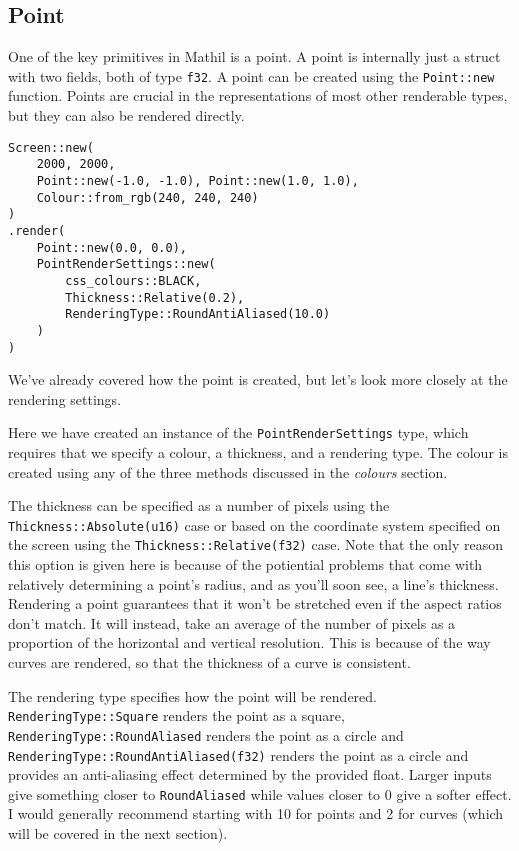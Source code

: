 \subsection{Point}

One of the key primitives in Mathil is a point. A point is internally just a struct with two fields, both of type \verb|f32|. A point can be created using the \verb|Point::new| function. Points are crucial in the representations of most other renderable types, but they can also be rendered directly.

\begin{lstlisting}
Screen::new(
    2000, 2000,
    Point::new(-1.0, -1.0), Point::new(1.0, 1.0),
    Colour::from_rgb(240, 240, 240)
)
.render(
    Point::new(0.0, 0.0),
    PointRenderSettings::new(
        css_colours::BLACK,
        Thickness::Relative(0.2),
        RenderingType::RoundAntiAliased(10.0)
    )
)
\end{lstlisting}


We've already covered how the point is created, but let's look more closely at the rendering settings.

Here we have created an instance of the \verb|PointRenderSettings| type, which requires that we specify a colour, a thickness, and a rendering type. The colour is created using any of the three methods discussed in the \emph{colours} section.

The thickness can be specified as a number of pixels using the \verb|Thickness::Absolute(u16)| case or based on the coordinate system specified on the screen using the \verb|Thickness::Relative(f32)| case. Note that the only reason this option is given here is because of the potiential problems that come with relatively determining a point's radius, and as you'll soon see, a line's thickness. Rendering a point guarantees that it won't be stretched even if the aspect ratios don't match. It will instead, take an average of the number of pixels as a proportion of the horizontal and vertical resolution. This is because of the way curves are rendered, so that the thickness of a curve is consistent.

The rendering type specifies how the point will be rendered. \verb|RenderingType::Square| renders the point as a square, \verb|RenderingType::RoundAliased| renders the point as a circle and \verb|RenderingType::RoundAntiAliased(f32)| renders the point as a circle and provides an anti-aliasing effect determined by the provided float. Larger inputs give something closer to \verb|RoundAliased| while values closer to 0 give a softer effect. I would generally recommend starting with 10 for points and 2 for curves (which will be covered in the next section).

